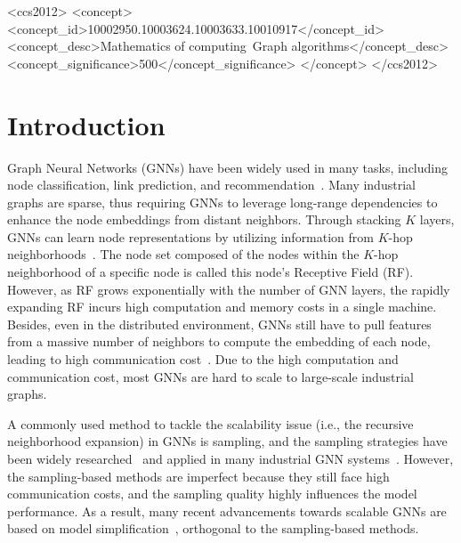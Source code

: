 \documentclass[sigconf]{acmart}
\begin{document}
\begin{CCSXML}
<ccs2012>
<concept>
<concept_id>10002950.10003624.10003633.10010917</concept_id>
<concept_desc>Mathematics of computing~Graph algorithms</concept_desc>
<concept_significance>500</concept_significance>
</concept>
</ccs2012>
\end{CCSXML}




\maketitle





\section{Introduction}
Graph Neural Networks (GNNs) have been widely used in many tasks, including node classification, link prediction, and recommendation~\citep{zhang2020reliable, zhang2021rod, cui2020adaptive, miao2021degnn,jiang2022zoomer}.
Many industrial graphs are sparse, thus requiring GNNs to leverage long-range dependencies to enhance the node embeddings from distant neighbors.
Through stacking $K$ layers, GNNs can learn node representations by utilizing information from $K$-hop neighborhoods~\cite{miao2021lasagne}. 
The node set composed of the nodes within the $K$-hop neighborhood of a specific node is called this node's Receptive Field (RF).
However, as RF grows exponentially with the number of GNN layers, the rapidly expanding RF incurs high computation and memory costs in a single machine. 
Besides, even in the distributed environment, GNNs still have to pull features from a massive number of neighbors to compute the embedding of each node, leading to high communication cost~\citep{distdgl_ai3_2020}.
Due to the high computation and communication cost, most GNNs are hard to scale to large-scale industrial graphs.

A commonly used method to tackle the scalability issue (i.e., the recursive neighborhood expansion) in GNNs is sampling, and the sampling strategies have been widely researched~\cite{hamilton2017inductive, DBLP:conf/iclr/ChenMX18} and applied in many industrial GNN systems~\cite{distdgl_ai3_2020, aligraph_vldb_2019}. However, the sampling-based methods are imperfect because they still face high communication costs, and the sampling quality highly influences the model performance. As a result, many recent advancements towards scalable GNNs are based on model simplification~\citep{wu2019simplifying,zhang2021node,zhang2022pasca}, orthogonal to the sampling-based methods.
\end{document}

